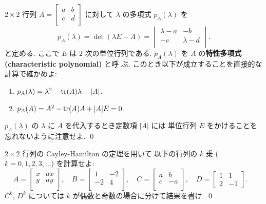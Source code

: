 \documentclass[12pt,twoside]{jarticle}
\begin{document}
\begin{question}
  \label{q:CH-2x2}
  $2\times 2$ 行列 $A =
  \begin{bmatrix}
    a & b \\
    c & d \\
  \end{bmatrix}$ に対して $\lambda$ の多項式 $p_A(\lambda)$ を
  \begin{equation*}
    p_A(\lambda) = \det(\lambda E - A) =
    \begin{vmatrix}
      \lambda - a & - b \\
      - c         & \lambda - d \\
    \end{vmatrix}.
  \end{equation*}
  と定める.  ここで $E$ は $2$ 次の単位行列である. 
  $p_A(\lambda)$ を $A$ の{\bf 特性多項式 (characteristic polynomial)} と呼
  ぶ.  このとき以下が成立することを直接的な計算で確かめよ:
  \begin{enumerate}
  \item $p_A(\lambda) = \lambda^2 - \mathop{\mathrm{tr}}\nolimits(A)\lambda + |A|$.
  \item $p_A(A) = A^2 - \mathop{\mathrm{tr}}\nolimits(A)A + |A|E = 0$.
  \end{enumerate}
  $p_A(\lambda)$ の $\lambda$ に $A$ を代入するとき定数項 $|A|$ には
  単位行列 $E$ をかけることを忘れないように注意せよ. \qed
\end{question}

\begin{question}
  \label{q:CH-2x2-1}
  $2\times 2$ 行列の Cayley-Hamilton の定理を用いて
  以下の行列の $k$ 乗 ($k=0,1,2,3,\ldots$) を計算せよ:
  \begin{equation*}
    A =
    \begin{bmatrix}
      x & ax \\
      y & ay \\
    \end{bmatrix},
    \quad
    B =
    \begin{bmatrix}
       1 & -2 \\
      -2 &  4 \\
    \end{bmatrix},
    \quad
    C =
    \begin{bmatrix}
      a &  b  \\
      c & -a  \\
    \end{bmatrix},
    \quad
    D =
    \begin{bmatrix}
      1 &  1 \\
      2 & -1
    \end{bmatrix}.
    \quad
  \end{equation*}
  $C^k$, $D^k$ については $k$ が偶数と奇数の場合に分けて結果を書け. 
  \qed
\end{question}
\end{document}

